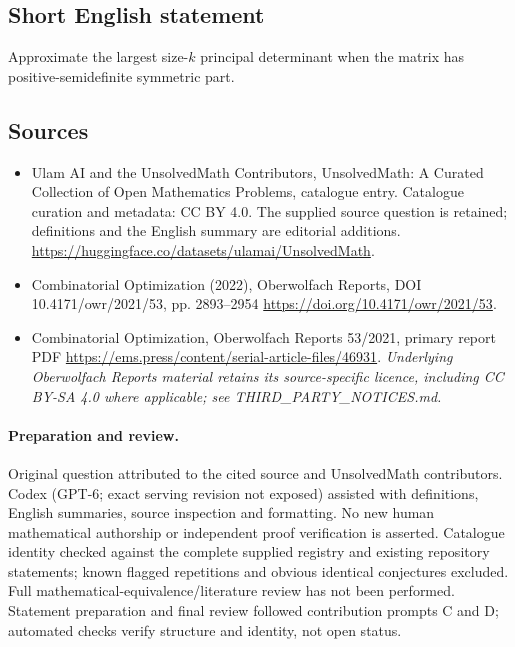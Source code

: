 \documentclass[11pt]{article}
\begin{document}
\subsection{Short English statement}
Approximate the largest size-$k$ principal determinant when the matrix has positive-semidefinite symmetric part.
\subsection{Sources}
\begin{itemize}
\item[\hypertarget{source:statement:1}{S1}] Ulam AI and the UnsolvedMath Contributors, UnsolvedMath: A Curated Collection of Open Mathematics Problems, catalogue entry. Catalogue curation and metadata: CC BY 4.0. The supplied source question is retained; definitions and the English summary are editorial additions.
\url{https://huggingface.co/datasets/ulamai/UnsolvedMath}.
\item[\hypertarget{source:statement:2}{S2}] Combinatorial Optimization (2022), Oberwolfach Reports, DOI 10.4171/owr/2021/53, pp. 2893--2954
\url{https://doi.org/10.4171/owr/2021/53}.
\item[\hypertarget{source:statement:3}{S3}] Combinatorial Optimization, Oberwolfach Reports 53/2021, primary report PDF
\url{https://ems.press/content/serial-article-files/46931}.
\textit{Underlying Oberwolfach Reports material retains its source-specific licence, including CC BY-SA 4.0 where applicable; see THIRD\_PARTY\_NOTICES.md.}
\end{itemize}
\paragraph{Preparation and review.}
Original question attributed to the cited source and UnsolvedMath contributors. Codex (GPT-6; exact serving revision not exposed) assisted with definitions, English summaries, source inspection and formatting. No new human mathematical authorship or independent proof verification is asserted. Catalogue identity checked against the complete supplied registry and existing repository statements; known flagged repetitions and obvious identical conjectures excluded. Full mathematical-equivalence/literature review has not been performed. Statement preparation and final review followed contribution prompts C and D; automated checks verify structure and identity, not open status.
\label{end:statement}
\end{document}
